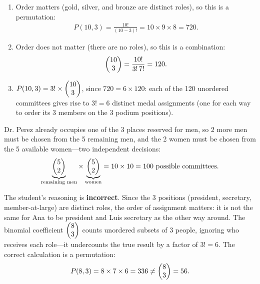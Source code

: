 \begin{solproblema}[prob:490657c]
	\begin{enumerate}
		\item Order matters (gold, silver, and bronze are distinct roles), so this is a permutation:
		\begin{align}
			P(10,3) = \frac{10!}{(10-3)!} = 10 \times 9 \times 8 = 720.
		\end{align}
		\item Order does not matter (there are no roles), so this is a combination:
		\begin{align}
			\begin{pmatrix} 10 \\ 3\end{pmatrix} = \frac{10!}{3!\,7!} = 120.
		\end{align}
		\item $P(10,3) = 3! \times \begin{pmatrix} 10 \\ 3\end{pmatrix}$, since $720 = 6 \times 120$: each of the 120 unordered committees gives rise to $3! = 6$ distinct medal assignments (one for each way to order its 3 members on the 3 podium positions).
	\end{enumerate}
\end{solproblema}

\begin{solproblema}[prob:d8ce0cf]
	Dr. Perez already occupies one of the 3 places reserved for men, so 2 more men must be chosen from the 5 remaining men, and the 2 women must be chosen from the 5 available women---two independent decisions:
	\begin{align}
		\underbrace{\begin{pmatrix} 5 \\ 2\end{pmatrix}}_{\text{remaining men}} \times \underbrace{\begin{pmatrix} 5 \\ 2\end{pmatrix}}_{\text{women}} = 10 \times 10 = 100 \text{ possible committees.}
	\end{align}
\end{solproblema}

\begin{solproblema}[prob:3007304]
	The student's reasoning is \textbf{incorrect}. Since the 3 positions (president, secretary, member-at-large) are distinct roles, the order of assignment matters: it is not the same for Ana to be president and Luis secretary as the other way around. The binomial coefficient $\begin{pmatrix} 8 \\ 3\end{pmatrix}$ counts unordered subsets of 3 people, ignoring who receives each role---it undercounts the true result by a factor of $3! = 6$. The correct calculation is a permutation:
	\begin{align}
		P(8,3) = 8 \times 7 \times 6 = 336 \neq \begin{pmatrix} 8 \\ 3\end{pmatrix} = 56.
	\end{align}
\end{solproblema}

